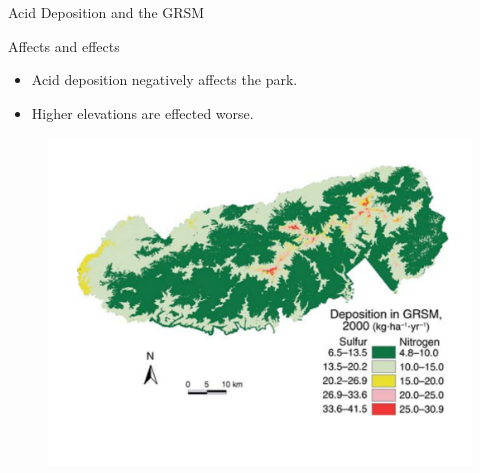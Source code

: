 \begin{frame}{Acid Deposition and the GRSM}

\begin{block}{Affects and effects}
	\begin{itemize}
		\item Acid deposition negatively affects the park.
		\item Higher elevations are effected worse.
	\end{itemize}
\end{block}
 
\begin{figure}
\centering			
\includegraphics[width=.70\textwidth]{Figures/DepositionHeat}
\end{figure}
		
\end{frame}